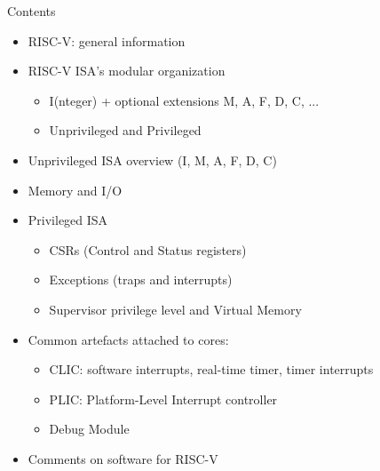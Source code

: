 \documentclass{article}
\begin{document}
\begin{center}
  {\Huge Contents}

  \vspace{0.5in}

  \begin{minipage}{9in}\LARGE
    \begin{itemize}

    \item RISC-V: general information

    \item RISC-V ISA's modular organization
      \begin{itemize}
      \item I(nteger) + optional extensions M, A, F, D, C, ...
      \item Unprivileged and Privileged
      \end{itemize}

    \item Unprivileged ISA overview (I, M, A, F, D, C)

    \item Memory and I/O

    \item Privileged ISA
      \begin{itemize}
      \item CSRs (Control and Status registers)
      \item Exceptions (traps and interrupts)
      \item Supervisor privilege level and Virtual Memory
      \end{itemize}

    \item Common artefacts attached to cores:
      \begin{itemize}
      \item CLIC: software interrupts, real-time timer, timer interrupts
      \item PLIC: Platform-Level Interrupt controller
      \item Debug Module
      \end{itemize}

    \item Comments on software for RISC-V
    \end{itemize}
  \end{minipage}
\end{center}

\clearpage

\end{document}
